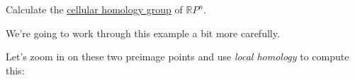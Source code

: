 \begin{exercise}
	Calculate the \hyperref[def:cellular-homology-group]{cellular homology group} of \(\mathbb{R} P^n\).
\end{exercise}

\begin{eg}
	We're going to work through this example a bit more carefully.
	\begin{figure}[H]
		\centering
		\label{fig:eg:more-careful-torus-cellular}
	\end{figure}
	Let's zoom in on these two preimage points and use \emph{local homology} to compute this:
\end{eg}